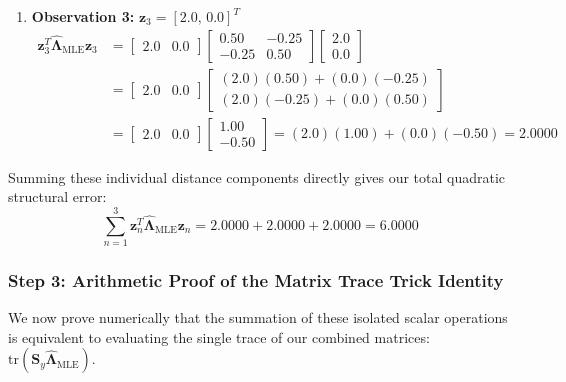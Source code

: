 \documentclass{article}
\begin{document}
\begin{enumerate}
    \item \textbf{Observation 3:} $\mathbf{z}_3 = [2.0, \, 0.0]^T$
    \begin{align*}
    \mathbf{z}_3^T \hat{\boldsymbol{\Lambda}}_{\text{MLE}} \mathbf{z}_3 &= \begin{bmatrix} 2.0 & 0.0 \end{bmatrix} \begin{bmatrix} 0.50 & -0.25 \\ -0.25 & 0.50 \end{bmatrix} \begin{bmatrix} 2.0 \\ 0.0 \end{bmatrix} \\
    &= \begin{bmatrix} 2.0 & 0.0 \end{bmatrix} \begin{bmatrix} (2.0)(0.50) + (0.0)(-0.25) \\ (2.0)(-0.25) + (0.0)(0.50) \end{bmatrix} \\
    &= \begin{bmatrix} 2.0 & 0.0 \end{bmatrix} \begin{bmatrix} 1.00 \\ -0.50 \end{bmatrix} = (2.0)(1.00) + (0.0)(-0.50) = \mathbf{2.0000}
    \end{align*}
\end{enumerate}

Summing these individual distance components directly gives our total quadratic structural error:
\begin{equation}
\sum_{n=1}^3 \mathbf{z}_n^T \hat{\boldsymbol{\Lambda}}_{\text{MLE}} \mathbf{z}_n = 2.0000 + 2.0000 + 2.0000 = \mathbf{6.0000}
\end{equation}

\subsubsection{Step 3: Arithmetic Proof of the Matrix Trace Trick Identity}

We now prove numerically that the summation of these isolated scalar operations is equivalent to evaluating the single trace of our combined matrices: $\text{tr}(\mathbf{S}_y \hat{\boldsymbol{\Lambda}}_{\text{MLE}})$. 
\end{document}
